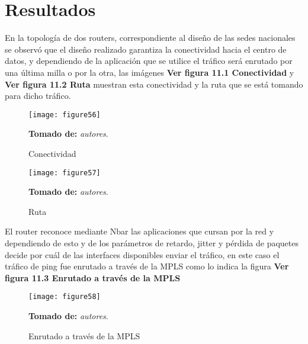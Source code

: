 \chapter{Resultados}
\label{cha:Resultados}

En la topología de dos routers, correspondiente al diseño de las sedes nacionales se observó que el diseño realizado garantiza la conectividad hacia el centro de datos, y dependiendo de la aplicación que se utilice el tráfico será enrutado por una última milla o por la otra, las imágenes  \textbf{Ver figura 11.1 Conectividad} y  \textbf{Ver figura 11.2  Ruta} muestran esta conectividad y la ruta que se está tomando para dicho tráfico. 

\begin{figure}[htbp]
  \centering
    {\texttt{[image: figure56]}}%
  \caption{ \footnotesize{Conectividad}}
  \footnotesize{\textbf{Tomado de:} \textit{autores}.}
  \label{fig:fig2subfig}
\end{figure}

\begin{figure}[htbp]
  \centering
    {\texttt{[image: figure57]}}%
  \caption{\footnotesize{ Ruta}}
  \footnotesize{\textbf{Tomado de:} \textit{autores}.}
  \label{fig:fig2subfig}
\end{figure}

El router reconoce mediante Nbar las aplicaciones que cursan por la red y dependiendo de esto y de los parámetros de retardo, jitter y pérdida de paquetes decide por cuál de las interfaces disponibles enviar el tráfico, en este caso el tráfico de ping fue enrutado a través de la MPLS como lo indica la figura \textbf{Ver figura 11.3 Enrutado a través de la MPLS}

\begin{figure}[htbp]
  \centering
    {\texttt{[image: figure58]}}%
  \caption{ \footnotesize{Enrutado a través de la MPLS}}
  \footnotesize{\textbf{Tomado de:} \textit{autores}.}
  \label{fig:fig2subfig}
\end{figure}

